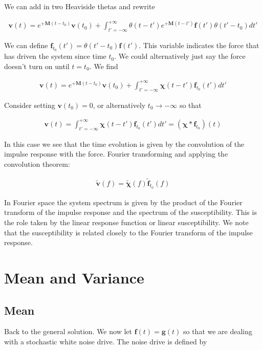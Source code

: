 \documentclass[12pt]{article}
\newcommand{\bv}[1]{\mathbf{#1}}
\begin{document}
We can add in two Heaviside thetas and rewrite

\begin{align}
\bv{v}(t) = e^{+\bv{M}(t-t_0)}\bv{v}(t_0) + \int_{t'=-\infty}^{+\infty} \theta(t-t')e^{+\bv{M}(t-t')}\bv{f}(t')\theta(t'-t_0) dt'
\end{align}

We can define $\bv{f}_{t_0}(t') = \theta(t'-t_0)\bv{f}(t')$. This variable indicates the force that has driven the system since time $t_0$. We could alternatively just say the force doesn't turn on until $t=t_0$. We find

\begin{align}
\bv{v}(t) = e^{+\bv{M}(t-t_0)}\bv{v}(t_0) + \int_{t'=-\infty}^{+\infty} \boldsymbol{\chi}(t-t')\bv{f}_{t_0}(t') dt'
\end{align}

Consider setting $\bv{v}(t_0)=0$, or alternatively $t_0\rightarrow -\infty$ so that

\begin{align}
\bv{v}(t) = \int_{t'=-\infty}^{+\infty} \boldsymbol{\chi}(t-t')\bv{f}_{t_0}(t') dt' = (\boldsymbol{\chi}\ast \bv{f}_{t_0})(t)
\end{align}

In this case we see that the time evolution is given by the convolution of the  impulse response with the force. Fourier transforming and applying the convolution theorem:

\begin{align}
\tilde{\bv{v}}(f) = \tilde{\boldsymbol{\chi}}(f) \tilde{\bv{f}}_{t_0}(f)
\end{align}

In Fourier space the system spectrum is given by the product of the Fourier transform of the impulse response and the spectrum of the susceptibility. This is the role taken by the linear response function or linear susceptibility. We note that the susceptibility is related closely to the Fourier transform of the impulse response.

\section*{Mean and Variance}
\subsection*{Mean}
Back to the general solution. We now let $\bv{f}(t) = \bv{g}(t)$ so that we are dealing with a stochastic white noise drive. The noise drive is defined by
\end{document}
